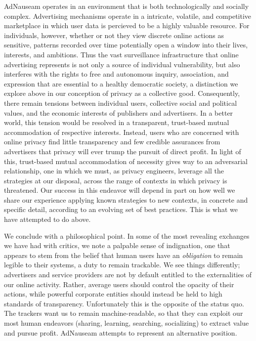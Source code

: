 \documentclass[conference]{IEEEtran}
\begin{document}
AdNauseam operates in an environment that is both technologically and socially complex. Advertising mechanisms operate in a intricate, volatile, and competitive marketplace in which user data is percieved to be a highly valuable resource. For individuals, however, whether or not they view discrete online actions as sensitive, patterns recorded over time potentially open a window into their lives, interests, and ambitions. Thus the vast surveillance infrastructure that online advertising represents is not only a source of individual vulnerability, but also interferes with the rights to free and autonomous inquiry, association, and expression that are essential to a healthy democratic society, a distinction we explore above in our conception of privacy as a collective good. Consequently, there remain tensions between individual users, collective social and political values, and the economic interests of publishers and advertisers. In a better world, this tension would be resolved in a transparent, trust-based mutual accommodation of respective interests. Instead, users who are concerned with online privacy find little transparency and few credible assurances from advertisers that privacy will ever trump the pursuit of direct profit. In light of this, trust-based mutual accommodation of necessity gives way to an adversarial relationship, one in which we must, as privacy engineers, leverage all the strategies at our disposal, across the range of contexts in which privacy is threatened. Our success in this endeavor will depend in part on how well we share our experience applying known strategies to new contexts, in concrete and specific detail, according to an evolving set of best practices. This is what we have attempted to do above.

We conclude with a philosophical point.
In some of the most revealing exchanges we have had with critics, we note a palpable sense of indignation, one that appears to stem from the belief that human users have an \emph{obligation} to remain legible to their systems, a duty to remain trackable. We see things differently; advertisers and service providers are not by default entitled to the externalities of our online activity. Rather, average users should control the opacity of their actions, while powerful corporate entities should instead be held to high standards of transparency. Unfortunately this is the opposite of the status quo. The trackers want us to remain machine-readable, so that they can exploit our most human endeavors (sharing, learning, searching, socializing) to extract value and pursue profit. AdNauseam attempts to represent an alternative position.
\end{document}
